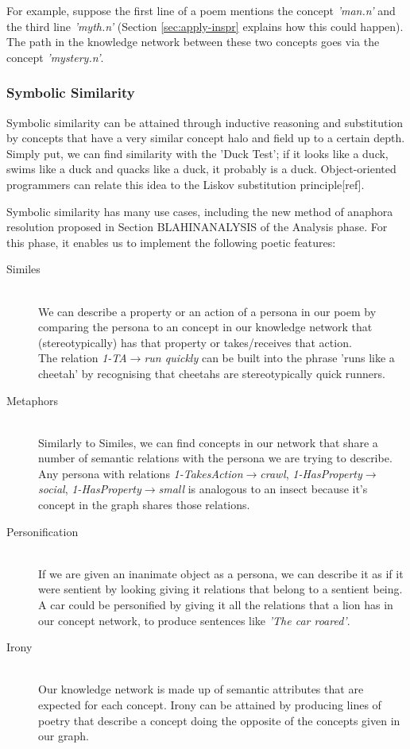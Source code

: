 For example, suppose the first line of a poem mentions the concept \textit{'man.n'} and the third line \textit{'myth.n'} (Section \ref{sec:apply-inspr} explains how this could happen). The path in the knowledge network between these two concepts goes via the concept \textit{'mystery.n'}.


\subsubsection{Symbolic Similarity}
Symbolic similarity can be attained through inductive reasoning and substitution by concepts that have a very similar concept halo and field up to a certain depth. Simply put, we can find similarity with the 'Duck Test'; if it looks like a duck, swims like a duck and quacks like a duck, it probably is a duck. Object-oriented programmers can relate this idea to the Liskov substitution principle[ref].

Symbolic similarity has many use cases, including the new method of anaphora resolution proposed in Section BLAHINANALYSIS of the Analysis phase. For this phase, it enables us to implement the following poetic features:
\begin{description}
\item[Similes] \hfill \\ We can describe a property or an action of a persona in our poem by comparing the persona to an concept in our knowledge network that (stereotypically) has that property or takes/receives that action. \hfill \\ The relation \textit{1-TA$\rightarrow$run quickly} can be built into the phrase 'runs like a cheetah' by recognising that cheetahs are stereotypically quick runners.
\item[Metaphors] \hfill \\ Similarly to Similes, we can find concepts in our network that share a number of semantic relations with the persona we are trying to describe. \hfill \\ Any persona with relations \textit{1-TakesAction$\rightarrow$crawl}, \textit{1-HasProperty$\rightarrow$social}, \textit{1-HasProperty$\rightarrow$small} is analogous to an insect because it's concept in the graph shares those relations.
\item[Personification] \hfill \\ If we are given an inanimate object as a persona, we can describe it as if it were sentient by looking giving it relations that belong to a sentient being. \hfill \\ A car could be personified by giving it all the relations that a lion has in our concept network, to produce sentences like \textit{'The car roared'}.
\item[Irony] \hfill \\ Our knowledge network is made up of semantic attributes that are expected for each concept. Irony can be attained by producing lines of poetry that describe a concept doing the opposite of the concepts given in our graph.
\end{description} 

